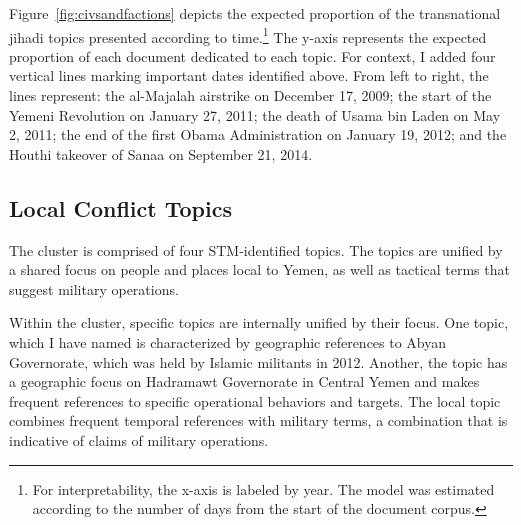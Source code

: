 

 Figure~\ref{fig:civsandfactions} depicts the expected proportion
of the transnational jihadi topics presented according to
time.\footnote{For interpretability, the x-axis is labeled by year. The model was
  estimated according to the number of days from the start of the
  document corpus.}  The y-axis represents the expected proportion of
each document dedicated to each topic. For context, I added four
vertical lines marking important dates identified above. From left to right, the
lines represent: the al-Majalah airstrike on December 17, 2009; the start of
the Yemeni Revolution on January 27, 2011; the death of Usama bin
Laden on May 2, 2011; the end of the first Obama Administration on
January 19, 2012; and the Houthi takeover of Sanaa on September 21, 2014.

\subsection{Local Conflict Topics}

The  cluster is comprised of four STM-identified topics. The topics are unified by a shared focus on people and places local to Yemen, as well as tactical terms that suggest military operations.  

Within the cluster, specific topics are internally unified by their focus. One topic, which I have named  is characterized by geographic references to Abyan Governorate, which was held by Islamic militants in 2012.  Another, the  topic has a geographic focus on Hadramawt Governorate in Central Yemen and makes frequent references to specific operational behaviors and targets. The  local topic combines frequent temporal references with military terms, a combination that is indicative of claims of military operations.

